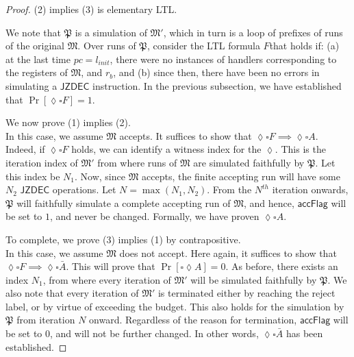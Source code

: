 \documentclass{article}
\theoremstyle{remark}
\newcommand{\program}{\mathfrak{P}}
\newcommand{\machine}{\mathfrak{M}}
\newcommand{\jzdec}{\mathsf{JZDEC}}
\newcommand{\accflag}{\mathsf{accFlag}}
\begin{document}
\begin{proof}
(2) implies (3) is elementary LTL.

We note that $\program$ is a simulation of $\machine'$, which in turn is a loop of prefixes of runs of the original $\machine$. Over runs of $\program$, consider the LTL formula $F$\footnotemark that holds if: (a) at the last time $pc = l_{init}$, there were no instances of handlers corresponding to the registers of $\machine$, and $r_b$, and (b) since then, there have been no errors in simulating a $\jzdec$ instruction. 
%
In the previous subsection, we have established that $\Pr[\lozenge\square F] = 1$.
\footnotemark


We now prove (1) implies (2). \\
In this case, we assume $\machine$ accepts. It suffices to show that $\lozenge\square F \implies \lozenge\square A$. Indeed, if $\lozenge\square F$ holds, we can identify a witness index for the $\lozenge$. This is the iteration index of $\machine'$ from where runs of $\machine$ are simulated faithfully by $\program$. Let this index be $N_1$. Now, since $\machine$ accepts, the finite accepting run will have some $N_2$ $\jzdec$ operations. Let $N = \max(N_1, N_2)$. From the $N^{th}$ iteration onwards, $\program$ will faithfully simulate a complete accepting run of $\machine$, and hence, $\accflag$ will be set to $1$, and never be changed. Formally, we have proven $\lozenge \square A$.

To complete, we prove (3) implies (1) by contrapositive. \\
In this case, we assume $\machine$ does not accept. Here again, it suffices to show that $\lozenge\square F \implies \lozenge\square \bar{A}$. This will prove that $\Pr[\square \lozenge A] = 0$. As before, there exists an index $N_1$, from where every iteration of $\machine'$ will be simulated faithfully by $\program$. We also note that every iteration of $\machine'$ is terminated either by reaching the reject label, or by virtue of exceeding the budget. This also holds for the simulation by $\program$ from iteration $N$ onward. Regardless of the reason for termination, $\accflag$ will be set to $0$, and will not be further changed. In other words, $\lozenge\square \bar{A}$ has been established. 
\end{proof}




\end{document}
